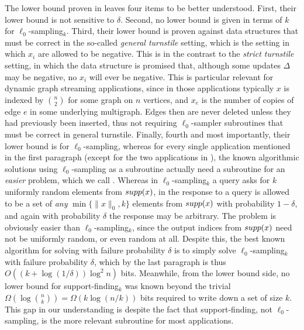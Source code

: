 The lower bound proven in \cite{JowhariST11} leaves four items to be better understood. First, their lower bound is not sensitive to $\delta$. Second, no lower bound is given in terms of $k$ for $\ell_0$-sampling$_k$. Third, their lower bound is proven against data structures that must be correct in the so-called {\em general turnstile} setting, which is the setting in which $x_i$ are allowed to be negative. This is in the contrast to the {\em strict turnstile} setting, in which the data structure is promised that, although some updates $\Delta$ may be negative, no $x_i$ will ever be negative. This is particular relevant for dynamic graph streaming applications, since in those applications typically $x$ is indexed by $\binom{n}{2}$ for some graph on $n$ vertices, and $x_e$ is the number of copies of edge $e$ in some underlying multigraph. Edges then are never deleted unless they had previously been inserted, thus not requiring $\ell_0$-sampler subroutines that must be correct in general turnstile. Finally, fourth and most importantly, their lower bound is for $\ell_0$-sampling, whereas for every single application mentioned in the first paragraph (except for the two applications in \cite{FrahlingIS08}), the known algorithmic solutions using $\ell_0$-sampling as a subroutine actually need a subroutine for an {\em easier} problem, which we call {\em {}}. Whereas in $\ell_0$-sampling$_k$ a query asks for $k$ uniformly random elements from $\mathop{supp}(x)$, in  the response to a query is allowed to be a set of {\em any} $\min\{\|x\|_0, k\}$ elements from $\mathop{supp}(x)$ with probability $1-\delta$, and again with probability $\delta$ the response may be arbitrary. The  problem is obviously easier than $\ell_0$-sampling$_k$, since the output indices from $\mathop{supp}(x)$ need not be uniformly random, or even random at all. Despite this, the best known algorithm for solving  with failure probability $\delta$ is to simply solve $\ell_0$-sampling$_k$ with failure probability $\delta$, which by the last paragraph is thus $O((k+\log(1/\delta))\log^2 n)$ bits. Meanwhile, from the lower bound side, no lower bound for support-finding$_k$ was known beyond the trivial $\Omega(\log\binom nk) = \Omega(k\log(n/k))$ bits required to write down a set of size $k$. This gap in our understanding is despite the fact that support-finding, not $\ell_0$-sampling, is the more relevant subroutine for most applications.


